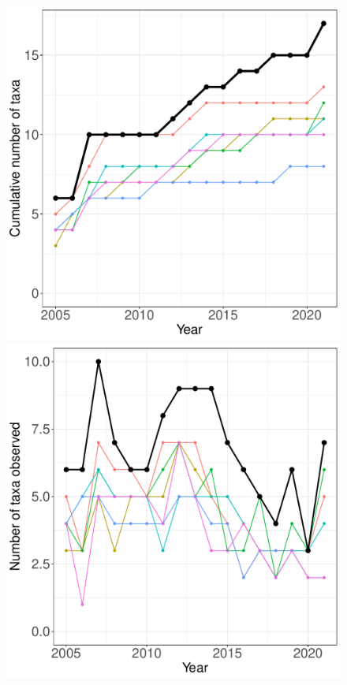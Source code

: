 \documentclass[11pt, oneside]{article}
\begin{document}
\begin{figure}[h!]
\centering
\includegraphics[scale = 0.4]{mcr-inverts-castorani_species_accumulation_curve.pdf}
\includegraphics[scale = 0.4]{mcr-inverts-castorani_num_taxa_over_time.pdf}

\end{figure}
\end{document}
